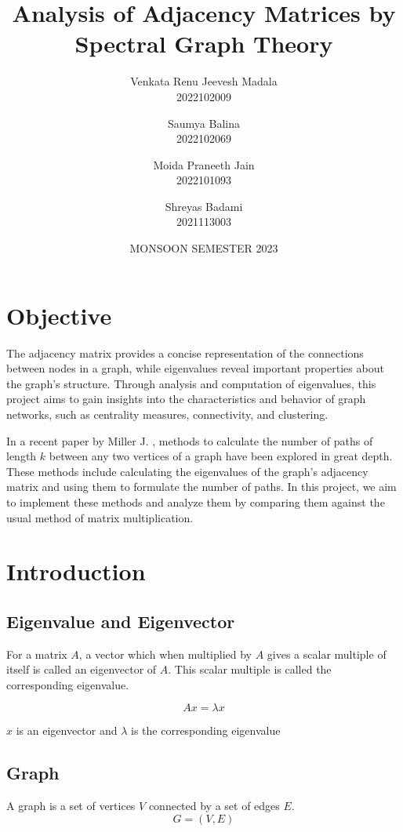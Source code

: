 \documentclass[12pt, a4paper]{article}
\title{Analysis of Adjacency Matrices by Spectral Graph Theory}
\author{
  Venkata Renu Jeevesh Madala\\
  2022102009
  \and
  Saumya Balina \\
  2022102069
  \and
  Moida Praneeth Jain \\
  2022101093
  \and
  Shreyas Badami \\
  2021113003
}
\date{MONSOON SEMESTER 2023}
\begin{document}
    \begin{titlepage}
      \maketitle
      \thispagestyle{empty}
    \end{titlepage}

    \section{Objective}
    \begin{flushleft}
    The adjacency matrix provides a concise representation of the connections between nodes in a graph, while eigenvalues reveal important properties about
    the graph’s structure. Through analysis and computation of eigenvalues, this
    project aims to gain insights into the characteristics and behavior of graph networks, such as centrality measures, connectivity, and clustering.

      In a recent paper by Miller J. \cite{Jason}, methods to calculate the number of paths of length $k$ between any two vertices of a graph have been explored in great depth. These methods include calculating the eigenvalues of the graph's adjacency matrix and using them to formulate the number of paths. In this project, we aim to implement these methods and analyze them by comparing them against the usual method of matrix multiplication.

    \end{flushleft}
    \section{Introduction}

      \subsection{Eigenvalue and Eigenvector}
      \begin{flushleft}
      For a matrix $A$, a vector which when multiplied by $A$ gives a scalar multiple of itself is called an eigenvector of $A$. This scalar multiple is called the corresponding eigenvalue.

      $$Ax = \lambda x$$

      $x$ is an eigenvector and $\lambda$ is the corresponding eigenvalue

      \end{flushleft}
      \subsection{Graph}
      A graph is a set of vertices $V$ connected by a set of edges $E$.  
      $$G = (V, E)$$
\end{document}
